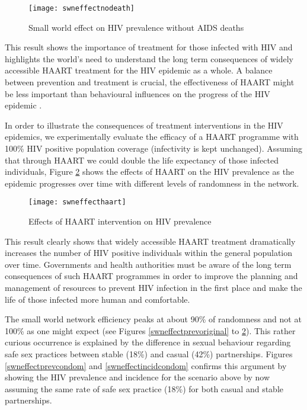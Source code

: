 \begin{figure}[ht]
\texttt{[image: swneffectnodeath]}
\caption{Small world effect on HIV prevalence without AIDS deaths}
\label{swneffectnodeath}
\end{figure}

This result shows the importance of treatment for those infected with HIV and highlights
the world's need to understand the long term consequences of widely accessible HAART
treatment for the HIV epidemic as a whole. A balance between prevention and treatment is
crucial, the effectiveness of HAART might be less important than behavioural influences
on the progress of the HIV epidemic \cite{Dangerfield2001}.

In order to illustrate the consequences of treatment interventions in the HIV epidemics,
we experimentally evaluate the efficacy of a HAART programme with 100\% HIV positive
population coverage (infectivity is kept unchanged). Assuming that through HAART we could
double the life expectancy of those infected individuals, Figure \ref{swneffecthaart}
shows the effects of HAART on the HIV prevalence as the epidemic progresses over time
with different levels of randomness in the network.

\begin{figure}[h]
\texttt{[image: swneffecthaart]}
\caption{Effects of HAART intervention on HIV prevalence} \label{swneffecthaart}
\end{figure}

This result clearly shows that widely accessible HAART treatment dramatically increases
the number of HIV positive individuals within the general population over time.
Governments and health authorities must be aware of the long term consequences of such
HAART programmes in order to improve the planning and management of resources to prevent
HIV infection in the first place and make the life of those infected more human and
comfortable.

The small world network efficiency peaks at about 90\% of randomness and not at 100\% as
one might expect (see Figures \ref{swneffectprevoriginal} to \ref{swneffecthaart}). This
rather curious occurrence is explained by the difference in sexual behaviour regarding
safe sex practices between stable (18\%) and casual (42\%) partnerships. Figures
\ref{swneffectprevcondom} and \ref{swneffectincidcondom} confirms this argument by
showing the HIV prevalence and incidence for the scenario above by now assuming the same
rate of safe sex practice (18\%) for both casual and stable partnerships.

